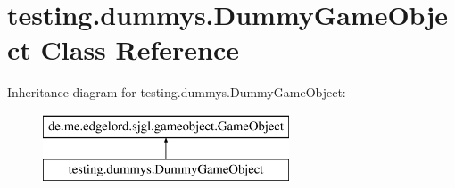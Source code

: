 \hypertarget{classtesting_1_1dummys_1_1_dummy_game_object}{}\section{testing.\+dummys.\+Dummy\+Game\+Object Class Reference}
\label{classtesting_1_1dummys_1_1_dummy_game_object}
Inheritance diagram for testing.\+dummys.\+Dummy\+Game\+Object\+:\begin{figure}[H]
\begin{center}
\leavevmode
\includegraphics[height=2.000000cm]{classtesting_1_1dummys_1_1_dummy_game_object}
\end{center}
\end{figure}
